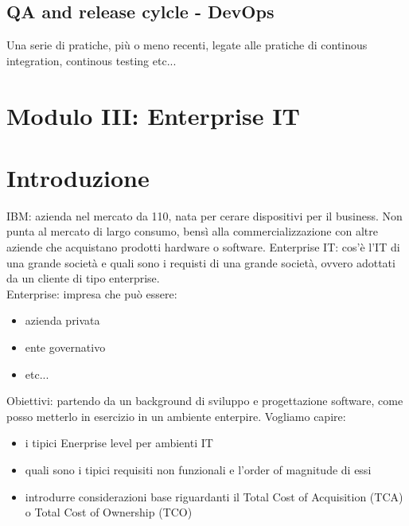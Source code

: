 \documentclass{article}
\begin{document}
\subsection{QA and release cylcle - DevOps}
Una serie di pratiche, più o meno recenti, legate alle pratiche di continous integration, continous testing etc...

\newpage
\section{Modulo III: Enterprise IT}
\section{Introduzione}
IBM: azienda nel mercato da 110, nata per cerare dispositivi per il business. Non punta al mercato di largo consumo, bensì alla commercializzazione con altre aziende che acquistano prodotti hardware o software. Enterprise IT: cos'è l'IT di una grande società e quali sono i requisti di una grande società, ovvero adottati da un cliente di tipo enterprise.\\ Enterprise: impresa che può essere:
\begin{itemize}
\item azienda privata
\item ente governativo
\item etc...
\end{itemize}
Obiettivi: partendo da un background di sviluppo e progettazione software, come posso metterlo in esercizio in un ambiente enterpire. Vogliamo capire:
\begin{itemize}
\item i tipici Enerprise level per ambienti IT
\item quali sono i tipici requisiti non funzionali e l'order of magnitude di essi
\item introdurre considerazioni base riguardanti il Total Cost of Acquisition (TCA) o Total Cost of Ownership (TCO)
\end{itemize}
\end{document}
